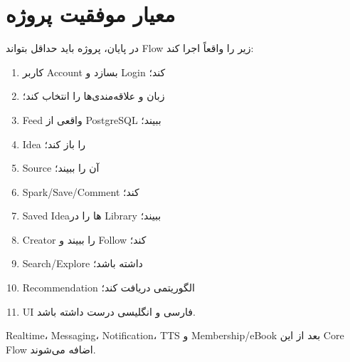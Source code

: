 \section{معیار موفقیت پروژه}

در پایان، پروژه باید حداقل بتواند Flow زیر را واقعاً اجرا کند:

\begin{enumerate}
  \item کاربر Account بسازد و Login کند؛
  \item زبان و علاقه‌مندی‌ها را انتخاب کند؛
  \item Feed واقعی از PostgreSQL ببیند؛
  \item Idea را باز کند؛
  \item Source آن را ببیند؛
  \item Spark/Save/Comment کند؛
  \item Saved Ideaها را در Library ببیند؛
  \item Creator را ببیند و Follow کند؛
  \item Search/Explore داشته باشد؛
  \item Recommendation الگوریتمی دریافت کند؛
  \item UI فارسی و انگلیسی درست داشته باشد.
\end{enumerate}

Realtime، Messaging، Notification، TTS و Membership/eBook بعد از این Core Flow اضافه می‌شوند.
